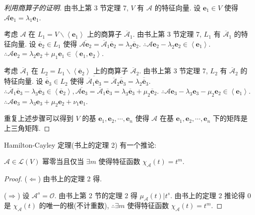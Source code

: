 \documentclass{ctexart}
\begin{document}
\begin{proof}[利用商算子的证明]
    由书上第 3 节定理 7, $V$ 有 $\mathcal{A}$ 的特征向量. 设 $\boldsymbol{e}_1\in V$ 使得 $\mathcal{A}\boldsymbol{e}_1=\lambda_1\boldsymbol{e}_1$.

    考虑 $\mathcal{A}$ 在 $L_1=V\backslash\left<\boldsymbol{e}_1\right>$ 上的商算子 $\overline{\mathcal{A}}_1$. 由书上第 3 节定理 7, $L_1$ 有 $\overline{\mathcal{A}}_1$ 的特征向量. 设 $\overline{\boldsymbol{e}}_2\in L_1$ 使得 $\overline{\mathcal{A}\boldsymbol{e}_2}=\overline{\mathcal{A}}_1\overline{\boldsymbol{e}}_2=\lambda_2\overline{\boldsymbol{e}}_2$. $\therefore\mathcal{A}\boldsymbol{e}_2-\lambda_2\boldsymbol{e}_2\in\left<\boldsymbol{e}_1\right>$. $\therefore\mathcal{A}\boldsymbol{e}_2=\lambda_2\boldsymbol{e}_2+\mu_1\boldsymbol{e}_1\in\left<\boldsymbol{e}_1,\boldsymbol{e}_2\right>$.

    考虑 $\overline{\mathcal{A}}_1$ 在 $L_2=L_1\backslash\left<\overline{\boldsymbol{e}}_2\right>$ 上的商算子 $\overline{\mathcal{A}}_2$. 由书上第 3 节定理 7, $L_2$ 有 $\overline{\mathcal{A}}_2$ 的特征向量. 设 $\overline{\overline{\boldsymbol{e}}}_3\in L_2$ 使得 $\overline{\overline{\mathcal{A}}_1\overline{\boldsymbol{e}}_3}=\overline{\mathcal{A}}_2\overline{\overline{\boldsymbol{e}}}_3=\lambda_2\overline{\overline{\boldsymbol{e}}}_3$. $\therefore\overline{\mathcal{A}}_1\overline{\boldsymbol{e}}_3-\lambda_3\overline{\boldsymbol{e}}_3\in\left<\overline{\boldsymbol{e}}_2\right>,\overline{\mathcal{A}\boldsymbol{e}_3}=\overline{\mathcal{A}}_1\overline{\boldsymbol{e}}_3=\lambda_3\overline{\boldsymbol{e}}_3+\mu_2\overline{\boldsymbol{e}}_2$. $\therefore\mathcal{A}\boldsymbol{e}_3-\lambda_3\boldsymbol{e}_3-\mu_2\boldsymbol{e}_2\in\left<\boldsymbol{e}_1\right>$. $\therefore\mathcal{A}\boldsymbol{e}_3=\lambda_3\boldsymbol{e}_3+\mu_2\boldsymbol{e}_2+\nu_1\boldsymbol{e}_1$.

    重复上述步骤可以得到 $V$ 的基 $\boldsymbol{e}_1,\boldsymbol{e}_2,\cdots,\boldsymbol{e}_n$ 使得 $\mathcal{A}$ 在基 $\boldsymbol{e}_1,\boldsymbol{e}_2,\cdots,\boldsymbol{e}_n$ 下的矩阵是上三角矩阵.
\end{proof}
Hamilton-Cayley 定理(书上的定理 2) 有一个推论:
\begin{corollary}\label{c4.1}
    $\mathcal{A}\in\mathcal{L}(V)$ 幂零当且仅当 $\exists m$ 使得特征函数 $\chi_{\mathcal{A}}(t)=t^m$.
\end{corollary}
\begin{proof}
    ($\Leftarrow$) 由书上的定理 2 得.

    ($\Rightarrow$) 设 $\mathcal{A}^s=\mathcal{O}$. 由书上第 2 节的定理 2 得 $\mu_\mathcal{A}(t)|t^s$. 由书上的定理 2 推论得 $0$ 是 $\chi_{\mathcal{A}}(t)$ 的唯一的根(不计重数), $\therefore\exists m$ 使得特征函数 $\chi_{\mathcal{A}}(t)=t^m$.
\end{proof}
\end{document}
